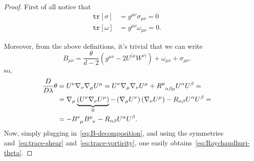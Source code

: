 	\begin{proof}
		First of all notice that 
		\begin{align}
			\label{eq:trace-shear}
			\texttt{tr}[\sigma] &= g^{\mu\nu}\sigma_{\mu\nu} = 0\\
			\label{eq:trace-vorticity}
			\texttt{tr}[\omega] &= g^{\mu\nu}\omega_{\mu\nu} = 0.
		\end{align}
		
		Moreover, from the above definitions, it's trivial that we can write
		\begin{equation}
		\label{eq:B-decomposition}
			B_{\mu\nu} = \frac{\theta}{d - 2} \left(g^{\mu\nu} - 2U^{(\mu}W^{\nu)}\right) +\omega_{\mu\nu} + \sigma_{\mu\nu}.
		\end{equation}
		so,
		\begin{align*}
			\frac{D}{D\lambda}\theta &= U^{\nu}\nabla_{\nu}\nabla_{\mu}U^{\mu} = U^{\nu}\nabla_{\mu}\nabla_{\nu}U^{\mu} + R\indices{^{\mu}_{\alpha\beta\mu}}U^{\alpha}U^{\beta} =\\
			&= \nabla_{\mu}\underbrace{\left(U^{\nu}\nabla_{\nu}U^{\mu}\right)}_{0} - \left(\nabla_{\mu}U^{\nu}\right)\left(\nabla_{\nu}U^{\mu}\right) - R_{\alpha\beta}U^{\alpha}U^{\beta} =\\
			&= - B\indices{^{\nu}_{\mu}}B\indices{^{\mu}_{\nu}} - R_{\alpha\beta}U^{\alpha}U^{\beta}.
		\end{align*}
		Now, simply plugging in~\eqref{eq:B-decomposition}, and using the symmetries and~\eqref{eq:trace-shear} and~\eqref{eq:trace-vorticity}, one easily obtains~\eqref{eq:Raychaudhuri-theta}.
		

\end{proof}
